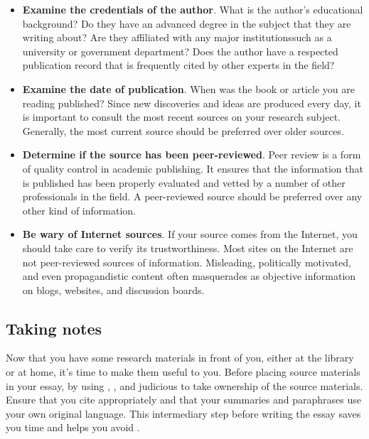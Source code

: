 \begin{itemize} \item \textbf{Examine the credentials of the author}. What is
the author's educational background? Do they have an advanced degree in the
subject that they are  writing about? Are they affiliated with any major
institutions\textemdash such  as a university or government department? Does the
author have a respected  publication record that is frequently cited by other
experts in the field?

\item \textbf{Examine the date of publication}. When was the book or article
you are reading published? Since new discoveries and ideas are produced every
day, it is important to consult the most recent sources on your research
subject. Generally, the most current source should be preferred over older
sources.

\item \textbf{Determine if the source has been peer-reviewed}. Peer review is a
form of quality control in academic publishing. It ensures that the information
that is published has been properly evaluated and vetted by a number of other
professionals in the field. A peer-reviewed source should be preferred over any
other kind of information.

\item \textbf{Be wary of Internet sources}. If your source comes from the
Internet, you should take care to verify its trustworthiness. Most sites on the
Internet are not peer-reviewed sources of information. Misleading, politically
motivated, and even propagandistic content often masquerades as objective
information on blogs, websites, and discussion boards.  \end{itemize}

\subsection{Taking notes}

Now that you have some research materials in front of you, either at the
library or at home, it's time to make them useful to you. Before placing source
materials in your essay, \hyperlink{notes}{\color{Ahrenge}{take good notes}} by using \hyperlink{summary}{\color{Ahrenge}{summary}}, \hyperlink{paraphrase}{\color{Ahrenge}{paraphrase}}, and judicious \hyperlink{quotation}{\color{Ahrenge}{quotation}} to take ownership of the source materials. Ensure that
you cite appropriately and that your summaries and paraphrases use your own
original language. This intermediary step before writing the essay saves you
time and helps you avoid \hyperlink{plagiarism}{\color{Ahrenge}{plagiarism}}.

